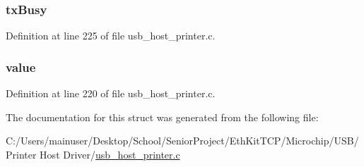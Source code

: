 \subsubsection[{tx\+Busy}]{ tx\+Busy}\label{struct___u_s_b___p_r_i_n_t_e_r___d_e_v_i_c_e_a69788803a53bf6dfcdbd0c7d1b53d6b3}


Definition at line 225 of file usb\+\_\+host\+\_\+printer.\+c.

\hypertarget{struct___u_s_b___p_r_i_n_t_e_r___d_e_v_i_c_e_a6bcc1b836cedcc585ba2018f6cb737ff}{}
\subsubsection[{value}]{ value}\label{struct___u_s_b___p_r_i_n_t_e_r___d_e_v_i_c_e_a6bcc1b836cedcc585ba2018f6cb737ff}


Definition at line 220 of file usb\+\_\+host\+\_\+printer.\+c.



The documentation for this struct was generated from the following file\+:\begin{DoxyCompactItemize}
\item 
C\+:/\+Users/mainuser/\+Desktop/\+School/\+Senior\+Project/\+Eth\+Kit\+T\+C\+P/\+Microchip/\+U\+S\+B/\+Printer Host Driver/\hyperlink{usb__host__printer_8c}{usb\+\_\+host\+\_\+printer.\+c}\end{DoxyCompactItemize}
